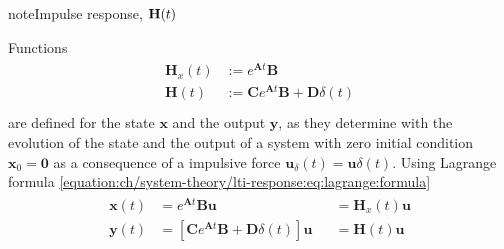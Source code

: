 \documentclass[letterpaper,10pt,english]{jupyterBook}
\begin{document}
\begin{sphinxadmonition}{note}{Impulse response, \protect\( \mathbf{H}(t)\protect\)}

\sphinxAtStartPar
Functions
\begin{equation*}
\begin{split}\begin{aligned}
  \mathbf{H}_x(t) & := e^{\mathbf{A} t} \mathbf{B} \\
  \mathbf{H}  (t) & := \mathbf{C} e^{\mathbf{A} t} \mathbf{B} + \mathbf{D} \delta(t) \\
\end{aligned}\end{split}
\end{equation*}
\sphinxAtStartPar
are defined  for the state \(\mathbf{x}\) and the output \(\mathbf{y}\), as they determine with the evolution of the state and the output of a system with zero initial condition \(\mathbf{x}_0 = \mathbf{0}\) as a consequence of a impulsive force \(\mathbf{u}_{\delta}(t) = \mathbf{u} \delta(t)\). Using Lagrange formula \eqref{equation:ch/system-theory/lti-response:eq:lagrange:formula}
\begin{equation}\label{equation:ch/system-theory/lti-response:eq:lagrange:formula:impulse}
\begin{split}\begin{aligned}
  \mathbf{x}(t) & = e^{\mathbf{A}t} \mathbf{B} \mathbf{u} && = \mathbf{H}_x(t) \mathbf{u} \\ 
  \mathbf{y}(t) & = \left[ \mathbf{C} e^{\mathbf{A}t} \mathbf{B} + \mathbf{D} \delta(t) \right] \mathbf{u} && = \mathbf{H}(t) \mathbf{u} \\
\end{aligned}\end{split}
\end{equation}\end{sphinxadmonition}
\end{document}
